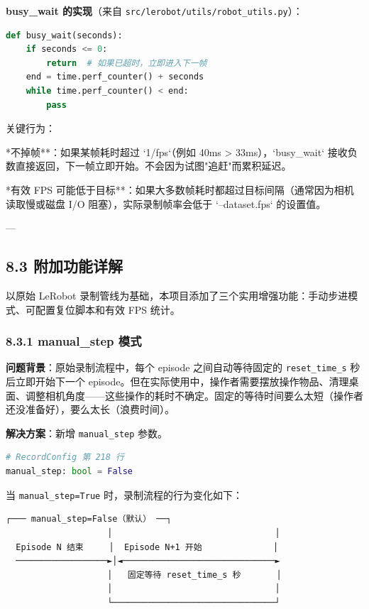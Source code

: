 \documentclass[UTF8,a4paper,11pt]{ctexart}
\begin{document}
{\textbf{busy_wait 的实现}（来自 \texttt{src/lerobot/utils/robot_utils.py}）：

\begin{lstlisting}[language=python]
def busy_wait(seconds):
    if seconds <= 0:
        return  # 如果已超时，立即进入下一帧
    end = time.perf_counter() + seconds
    while time.perf_counter() < end:
        pass
\end{lstlisting}

关键行为：
\item **不掉帧**：如果某帧耗时超过 `1/fps`（例如 40ms > 33ms），`busy_wait` 接收负数直接返回，下一帧立即开始。不会因为试图"追赶"而累积延迟。
\item **有效 FPS 可能低于目标**：如果大多数帧耗时都超过目标间隔（通常因为相机读取慢或磁盘 I/O 阻塞），实际录制帧率会低于 `--dataset.fps` 的设置值。

---

\subsection{8.3 附加功能详解}

以原始 LeRobot 录制管线为基础，本项目添加了三个实用增强功能：手动步进模式、可配置复位脚本和有效 FPS 统计。

\subsubsection{8.3.1 manual_step 模式}

\textbf{问题背景}：原始录制流程中，每个 episode 之间自动等待固定的 \texttt{reset_time_s} 秒后立即开始下一个 episode。但在实际使用中，操作者需要摆放操作物品、清理桌面、调整相机角度——这些操作的耗时不确定。固定的等待时间要么太短（操作者还没准备好），要么太长（浪费时间）。

\textbf{解决方案}：新增 \texttt{manual_step} 参数。

\begin{lstlisting}[language=python]
# RecordConfig 第 218 行
manual_step: bool = False
\end{lstlisting}

当 \texttt{manual_step=True} 时，录制流程的行为变化如下：

\begin{lstlisting}[language=text]
                    ┌─── manual_step=False（默认） ──┐
                    │                                │
  Episode N 结束     │  Episode N+1 开始              │
  ──────────────────►│◄──────────────────────────────►
                    │   固定等待 reset_time_s 秒       │
                    │                                │
                    └────────────────────────────────┘


\end{lstlisting}}
\end{document}
